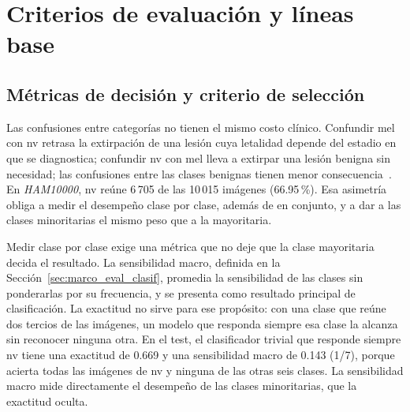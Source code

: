 
\section{Criterios de evaluación y líneas base}
\label{sec:met_protocolo}

\subsection{Métricas de decisión y criterio de selección}
\label{sec:met_seleccion}

Las confusiones entre categorías no tienen el mismo costo clínico. Confundir \gls{mel} con \gls{nv} retrasa la
extirpación de una lesión cuya letalidad depende del estadio en que se diagnostica; confundir \gls{nv} con \gls{mel}
lleva a extirpar una lesión benigna sin necesidad; las confusiones entre las clases benignas tienen menor
consecuencia~\cite{tschandl2018ham10000,nci2026melanoma}. En \emph{HAM10000}, \gls{nv} reúne 6\,705 de las
10\,015 imágenes (66.95\,\%). Esa asimetría obliga a medir el desempeño clase por clase, además de en conjunto,
y a dar a las clases minoritarias el mismo peso que a la mayoritaria.

Medir clase por clase exige una métrica que no deje que la clase mayoritaria decida el resultado. La
sensibilidad macro, definida en la Sección~\ref{sec:marco_eval_clasif}, promedia la sensibilidad de las clases
sin ponderarlas por su frecuencia, y se presenta como resultado principal de clasificación. La exactitud no sirve
para ese propósito: con una clase que reúne dos tercios de las imágenes, un modelo que responda siempre esa clase
la alcanza sin reconocer ninguna otra. En el test, el clasificador trivial que responde siempre \gls{nv} tiene una
exactitud de 0.669 y una sensibilidad macro de 0.143 (1/7), porque acierta todas las imágenes de \gls{nv} y ninguna
de las otras seis clases. La sensibilidad macro mide directamente el desempeño de las clases minoritarias, que la
exactitud oculta.


